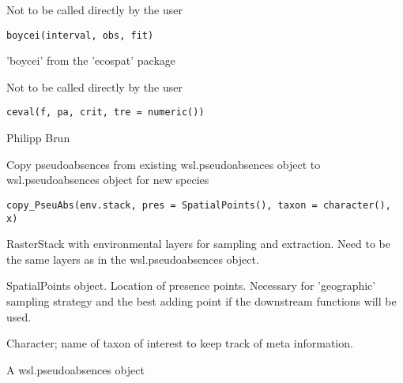 \documentclass[a4paper]{book}
\begin{document}
%
\begin{Description}\relax
Not to be called directly by the user
\end{Description}
%
\begin{Usage}
\begin{verbatim}
boycei(interval, obs, fit)
\end{verbatim}
\end{Usage}
%
\begin{Author}\relax
'boycei' from the 'ecospat' package
\end{Author}
%
\begin{Description}\relax
Not to be called directly by the user
\end{Description}
%
\begin{Usage}
\begin{verbatim}
ceval(f, pa, crit, tre = numeric())
\end{verbatim}
\end{Usage}
%
\begin{Author}\relax
Philipp Brun
\end{Author}
%
\begin{Description}\relax
Copy pseudoabsences from existing wsl.pseudoabsences object to wsl.pseudoabsences
object for new species
\end{Description}
%
\begin{Usage}
\begin{verbatim}
copy_PseuAbs(env.stack, pres = SpatialPoints(), taxon = character(), x)
\end{verbatim}
\end{Usage}
%
\begin{Arguments}
\begin{ldescription}
\item[\code{env.stack}] RasterStack with environmental layers for sampling and
extraction. Need to be the same layers as in the wsl.pseudoabsences object.

\item[\code{pres}] SpatialPoints object. Location of presence points. Necessary for
'geographic' sampling strategy and the best adding point if the downstream
functions will be used.

\item[\code{taxon}] Character; name of taxon of interest to keep track of meta
information.

\item[\code{x}] A wsl.pseudoabsences object
\end{ldescription}
\end{Arguments}
\end{document}
